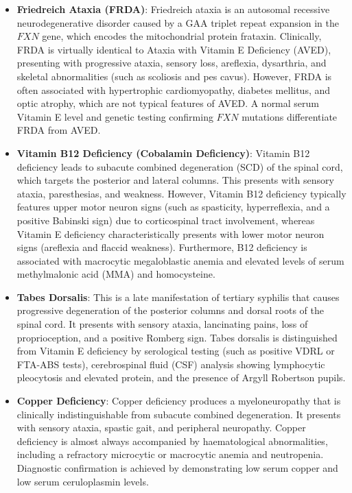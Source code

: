 \begin{itemize}
    \item \textbf{Friedreich Ataxia (FRDA)}: Friedreich ataxia is an autosomal recessive neurodegenerative disorder caused by a GAA triplet repeat expansion in the $FXN$ gene, which encodes the mitochondrial protein frataxin. Clinically, FRDA is virtually identical to Ataxia with Vitamin E Deficiency (AVED), presenting with progressive ataxia, sensory loss, areflexia, dysarthria, and skeletal abnormalities (such as scoliosis and pes cavus). However, FRDA is often associated with hypertrophic cardiomyopathy, diabetes mellitus, and optic atrophy, which are not typical features of AVED. A normal serum Vitamin E level and genetic testing confirming $FXN$ mutations differentiate FRDA from AVED.
    \item \textbf{Vitamin B12 Deficiency (Cobalamin Deficiency)}: Vitamin B12 deficiency leads to subacute combined degeneration (SCD) of the spinal cord, which targets the posterior and lateral columns. This presents with sensory ataxia, paresthesias, and weakness. However, Vitamin B12 deficiency typically features upper motor neuron signs (such as spasticity, hyperreflexia, and a positive Babinski sign) due to corticospinal tract involvement, whereas Vitamin E deficiency characteristically presents with lower motor neuron signs (areflexia and flaccid weakness). Furthermore, B12 deficiency is associated with macrocytic megaloblastic anemia and elevated levels of serum methylmalonic acid (MMA) and homocysteine.
    \item \textbf{Tabes Dorsalis}: This is a late manifestation of tertiary syphilis that causes progressive degeneration of the posterior columns and dorsal roots of the spinal cord. It presents with sensory ataxia, lancinating pains, loss of proprioception, and a positive Romberg sign. Tabes dorsalis is distinguished from Vitamin E deficiency by serological testing (such as positive VDRL or FTA-ABS tests), cerebrospinal fluid (CSF) analysis showing lymphocytic pleocytosis and elevated protein, and the presence of Argyll Robertson pupils.
    \item \textbf{Copper Deficiency}: Copper deficiency produces a myeloneuropathy that is clinically indistinguishable from subacute combined degeneration. It presents with sensory ataxia, spastic gait, and peripheral neuropathy. Copper deficiency is almost always accompanied by haematological abnormalities, including a refractory microcytic or macrocytic anemia and neutropenia. Diagnostic confirmation is achieved by demonstrating low serum copper and low serum ceruloplasmin levels.

\end{itemize}
